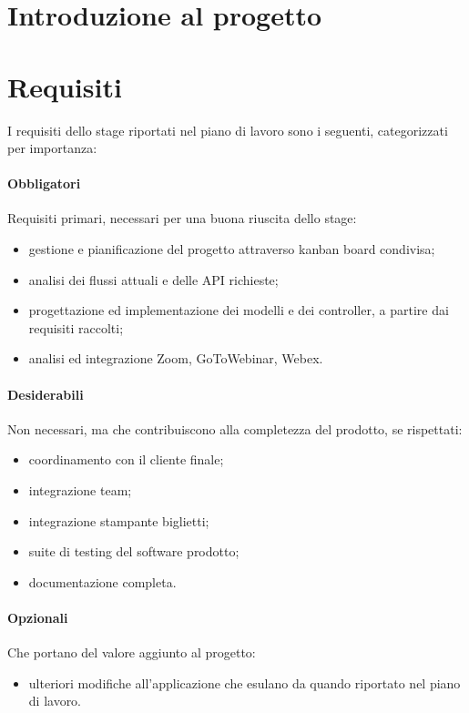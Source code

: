 \section{Introduzione al progetto}


\section{Requisiti}
I requisiti dello stage riportati nel piano di lavoro sono i seguenti, categorizzati per importanza:

\paragraph{Obbligatori} Requisiti primari, necessari per una buona riuscita dello stage:
\begin{itemize}
	\item gestione e pianificazione del progetto attraverso kanban board condivisa;
	\item analisi dei flussi attuali e delle API richieste;
	\item progettazione ed implementazione dei modelli e dei controller, a partire dai requisiti raccolti;
	\item analisi ed integrazione Zoom, GoToWebinar, Webex.
\end{itemize}

\paragraph{Desiderabili} Non necessari, ma che contribuiscono alla completezza del prodotto, se rispettati:
\begin{itemize}
	\item coordinamento con il cliente finale;
	\item integrazione team;
	\item integrazione stampante biglietti;
	\item suite di testing del software prodotto;
	\item documentazione completa.
\end{itemize}

\paragraph{Opzionali} Che portano del valore aggiunto al progetto:
\begin{itemize}
	\item ulteriori modifiche all'applicazione che esulano da quando riportato nel piano di lavoro.
\end{itemize}


